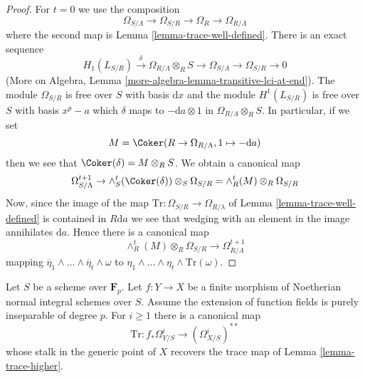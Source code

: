 \begin{proof}
For $t = 0$ we use the composition
$$
\Omega_{S/\Lambda} \to \Omega_{S/R} \to \Omega_R \to \Omega_{R/\Lambda}
$$
where the second map is Lemma \ref{lemma-trace-well-defined}.
There is an exact sequence
$$
H_1(L_{S/R}) \xrightarrow{\delta} \Omega_{R/\Lambda} \otimes_R S \to
\Omega_{S/\Lambda} \to \Omega_{S/R} \to 0
$$
(More on Algebra, Lemma \ref{more-algebra-lemma-transitive-lci-at-end}).
The module $\Omega_{S/R}$ is free over $S$ with basis $\text{d}x$
and the module $H^1(L_{S/R})$ is free over $S$ with basis $x^p - a$
which $\delta$ maps to $-\text{d}a \otimes 1$ in
$\Omega_{R/\Lambda} \otimes_R S$. In particular, if we set
$$
M = \Coker(R \to \Omega_{R/\Lambda}, 1 \mapsto -\text{d}a)
$$
then we see that $\Coker(\delta) = M \otimes_R S$. We obtain a
canonical map
$$
\Omega^{t + 1}_{S/\Lambda} \to
\wedge_S^t(\Coker(\delta)) \otimes_S \Omega_{S/R} =
\wedge^t_R(M) \otimes_R \Omega_{S/R}
$$
Now, since the image of the map
$\text{Tr} : \Omega_{S/R} \to \Omega_{R/\lambda}$
of Lemma \ref{lemma-trace-well-defined} is contained in $R\text{d}a$ we
see that wedging with an element in the image annihilates $\text{d}a$.
Hence there is a canonical map
$$
\wedge^t_R(M) \otimes_R \Omega_{S/R} \to \Omega_{R/\Lambda}^{t + 1}
$$
mapping
$\overline{\eta}_1 \wedge \ldots \wedge \overline{\eta}_t \wedge \omega$
to $\eta_1 \wedge \ldots \wedge \eta_t \wedge \text{Tr}(\omega)$.
\end{proof}

\begin{lemma}
\label{lemma-trace-extends}
Let $S$ be a scheme over $\mathbf{F}_p$.
Let $f : Y \to X$ be a finite morphism of Noetherian normal integral schemes
over $S$. Assume the extension of function fields is
purely inseparable of degree $p$. For $i \geq 1$ there is a canonical map
$$
\text{Tr} : f_*\Omega^i_{Y/S} \longrightarrow (\Omega_{X/S}^i)^{**}
$$
whose stalk in the generic point of $X$ recovers the trace map of
Lemma \ref{lemma-trace-higher}.
\end{lemma}

